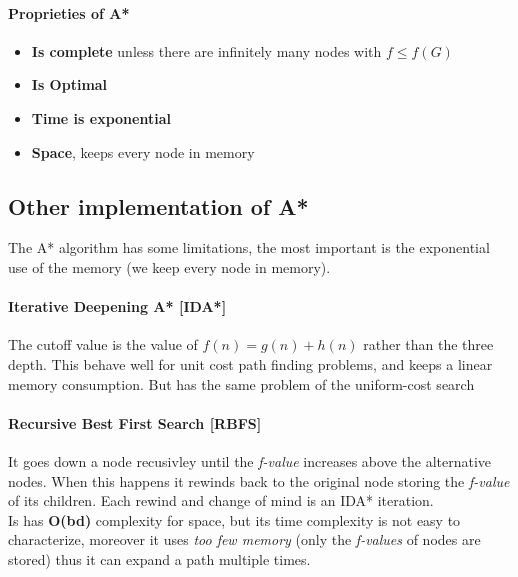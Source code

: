 \documentclass[10pt,a4paper]{article}
\begin{document}
\paragraph{Proprieties of A*}
\begin{itemize}
\item \textbf{Is complete} unless there are infinitely many nodes with $f \le f(G)$
\item \textbf{Is Optimal}

\item \textbf{Time is exponential}
\item \textbf{Space}, keeps every node in memory

\end{itemize}


\subsection{Other implementation of A*}
The A* algorithm has some limitations, the most important is the exponential use of the memory (we keep every node in memory).

\paragraph{Iterative Deepening A* [IDA*]}
The cutoff value is the value of $f(n)=g(n)+h(n)$ rather than the three depth. This behave well for unit cost path finding problems, and keeps a linear memory consumption. But has the same problem of the uniform-cost search

\paragraph{Recursive Best First Search [RBFS]} 
It goes down a node recusivley until the \textit{f-value} increases above the alternative nodes. When this happens it rewinds back to the original node storing the \textit{f-value} of its children. Each rewind and change of mind is an IDA* iteration.\\
Is has \textbf{O(bd)} complexity for space, but its time complexity is not easy to characterize, moreover it uses \textit{too few memory} (only the \textit{f-values} of nodes are stored) thus it can expand a path multiple times.
\end{document}

